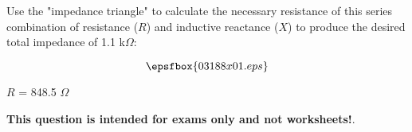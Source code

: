 

Use the "impedance triangle" to calculate the necessary resistance of this series combination of resistance ($R$) and inductive reactance ($X$) to produce the desired total impedance of 1.1 k$\Omega$:

$$\epsfbox{03188x01.eps}$$







$R$ = 848.5 $\Omega$







{\bf This question is intended for exams only and not worksheets!}.




